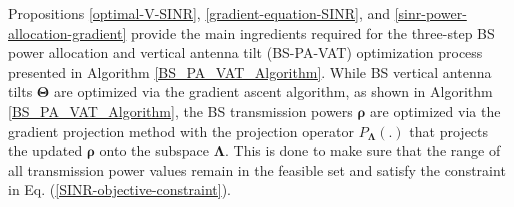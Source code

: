 Propositions \ref{optimal-V-SINR}, \ref{gradient-equation-SINR}, and \ref{sinr-power-allocation-gradient} provide the main ingredients required for the three-step BS power allocation and vertical antenna tilt (BS-PA-VAT) optimization process presented in Algorithm \ref{BS_PA_VAT_Algorithm}. While BS vertical antenna tilts $\bm{\Theta}$ are optimized via the gradient ascent algorithm, as shown in Algorithm \ref{BS_PA_VAT_Algorithm}, the BS transmission powers $\bm{\rho}$ are optimized via the gradient projection method with the projection operator $P_{\bm{\Lambda}}(.)$ that projects the updated $\bm{\rho}$ onto the subspace $\bm{\Lambda}$. This is done to make sure that the range of all transmission power values remain in the feasible set and satisfy the constraint in Eq. (\ref{SINR-objective-constraint}).



